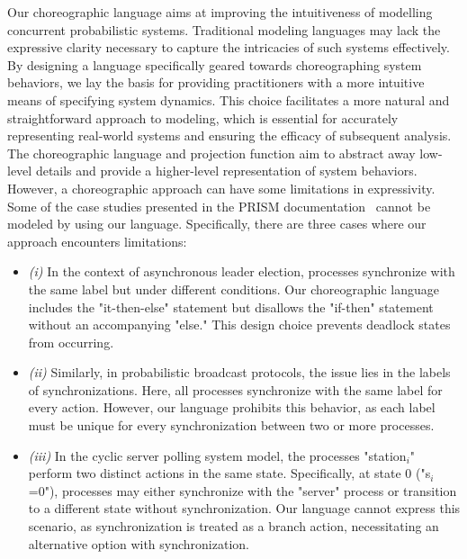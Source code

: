 Our choreographic language %
aims at improving the intuitiveness of modelling concurrent
probabilistic systems. Traditional modeling languages may lack the
expressive clarity necessary to capture the intricacies of such
systems effectively. By designing a language specifically geared
towards choreographing system behaviors, we lay the basis for
providing practitioners with a more intuitive means of specifying
system dynamics. This choice facilitates a more natural and
straightforward approach to modeling, which is essential for
accurately representing real-world systems and ensuring the efficacy
of subsequent analysis.
%
The choreographic language and projection function aim to abstract
away low-level details and provide a higher-level representation of
system behaviors. 
However, a choreographic approach can have some limitations in
expressivity. Some of the case studies presented in the PRISM
documentation~\cite{PRISMdoc} cannot be modeled by using our
language. Specifically, there are three cases where our approach
encounters limitations:
\begin{itemize}
\item \textit{(i)} In the context of asynchronous leader election,
  processes synchronize with the same label but under different
  conditions. Our choreographic language includes the "it-then-else"
  statement but disallows the "if-then" statement without an
  accompanying "else." This design choice prevents deadlock states
  from occurring.
\item \textit{(ii)} Similarly, in probabilistic broadcast protocols,
  the issue lies in the labels of synchronizations. Here, all
  processes synchronize with the same label for every action. However,
  our language prohibits this behavior, as each label must be unique
  for every synchronization between two or more processes.
\item \textit{(iii)} In the cyclic server polling system model, the
  processes "station$_i$" perform two distinct actions in the same
  state. Specifically, at state 0 ("s$_i$=0"), processes may either
  synchronize with the "server" process or transition to a different
  state without synchronization. Our language cannot express this
  scenario, as synchronization is treated as a branch action,
  necessitating an alternative option with synchronization.
\end{itemize}


